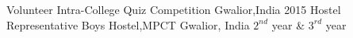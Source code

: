 \begin{cventries}
  \cventry
    {Volunteer}
    { Intra-College Quiz Competition}
    {Gwalior,India}
    {2015}
     {
    }
  \cventry
    {Hostel Representative}
    {Boys Hostel,MPCT}
    {Gwalior, India}
    {$2^{nd}$ year \& $3^{rd}$ year}
    {
    }
  

\end{cventries}
